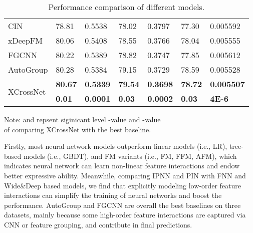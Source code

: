 \documentclass[letterpaper]{article} \usepackage{aaai21}  \usepackage{times}  \usepackage{helvet} \usepackage{courier}  \usepackage[hyphens]{url}  \usepackage{graphicx} \urlstyle{rm} \def\UrlFont{\rm}  \usepackage{natbib}  \usepackage{caption} \frenchspacing  \setlength{\pdfpagewidth}{8.5in}  \setlength{\pdfpageheight}{11in}  \usepackage{graphicx}
\begin{document}
\begin{table}[t]
{\begin{tabular}{p{1.25cm} <{\centering}|p{0.75cm} <{\centering} p{0.8cm} <{\centering}|p{0.75cm} <{\centering} p{0.83cm} <{\centering}|p{0.7cm} <{\centering} p{0.9cm} <{\centering}}
CIN                     & 78.81                   & 0.5538                    & 78.02                    & 0.3797                    & 77.30                    & 0.005592                    \\
xDeepFM                      & 80.06                    & 0.5408                    & 78.55                   & 0.3766                    & 78.04                    & 0.005555                    \\
FGCNN                      & 80.22                    & 0.5389                    & 78.82                   & 0.3747                   & 77.85                    & 0.005612                   \\
AutoGroup                      & 80.28                    & 0.5384                    & 79.15                    & 0.3729                    & 78.59                   & 0.005528                    \\
	\hline
		\multirow{2}{*}{XCrossNet}                     & \textbf{80.67}                    & \textbf{0.5339}                   & \textbf{79.54}                    & \textbf{0.3698}                    & \textbf{78.72}                    & \textbf{0.005507}                    \\
		& \textbf{0.01} & \textbf{0.0001} & \textbf{0.03} & \textbf{0.0002} & \textbf{0.03} &\textbf{ 4E-6} \\
	\hline
	\hline
	
	\end{tabular}
}

Note:  and  repsent siginicant level -value  and -value  \\ of comparing XCrossNet with the best baseline.
	\vspace{-0.2cm}
	\caption{Performance comparison of different models.}
	\label{table3}
	\vspace{-0.6cm}
\end{table}

Firstly, most neural network models outperform linear models (i.e., LR), tree-based models (i.e., GBDT), and FM variants (i.e., FM, FFM, AFM), which indicates neural network can learn non-linear feature interactions and endow better expressive ability. Meanwhile, comparing IPNN and PIN with FNN and Wide\&Deep based models, we find that explicitly modeling low-order feature interactions can simplify the training of neural networks and boost the performance. AutoGroup and FGCNN are overall the best baselines on three datasets, mainly because some high-order feature interactions are captured via CNN or feature grouping, and contribute in final predictions.
\end{document}

